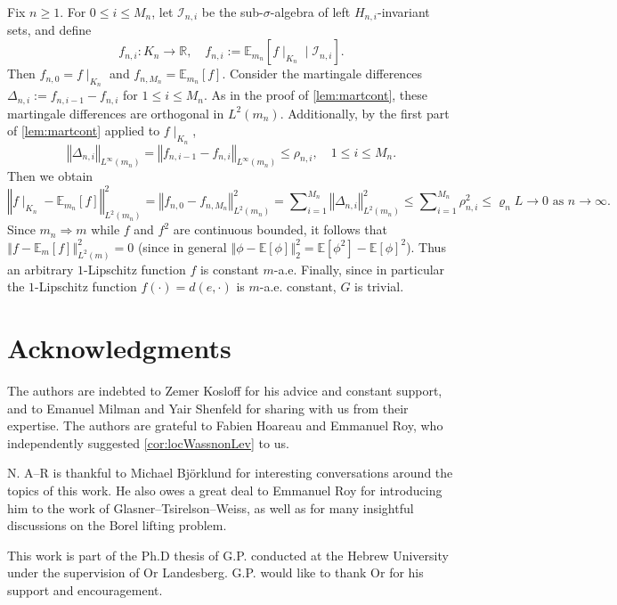 \documentclass{amsart}
\numberwithin{equation}{subsection}
\theoremstyle{plain}
\theoremstyle{definition}
\theoremstyle{plain}
\begin{document}
Fix \(n\geq1\). For \(0\leq i\leq M_{n}\), let \(\mathcal{I}_{n,i}\) be the sub-\(\sigma\)-algebra of left \(H_{n,i}\)-invariant sets, and define
\[f_{n,i}:K_{n}\to\mathbb{R},\quad f_{n,i}:=\mathbb{E}_{m_{n}}\left[f\mid_{K_{n}}\mid\mathcal{I}_{n,i}\right].\]
Then \(f_{n,0}=f\mid_{K_{n}}\) and \(f_{n,M_{n}}=\mathbb{E}_{m_{n}}\left[f\right]\). Consider the martingale differences \(\Delta_{n,i}:=f_{n,i-1}-f_{n,i}\) for \(1\leq i\leq M_{n}\). As in the proof of \cref{lem:martcont}, these martingale differences are orthogonal in \(L^{2}\left(m_{n}\right)\). Additionally, by the first part of \cref{lem:martcont} applied to \(f\mid_{K_{n}}\),
\[\left\Vert\Delta_{n,i}\right\Vert_{L^{\infty}\left(m_{n}\right)}=\left\Vert f_{n,i-1}-f_{n,i}\right\Vert_{L^{\infty}\left(m_{n}\right)}
\leq\rho_{n,i},\quad1\leq i\leq M_{n}.\]
Then we obtain
\[\left\Vert f\mid_{K_{n}}-\mathbb{E}_{m_{n}}\left[f\right]\right\Vert_{L^{2}\left(m_{n}\right)}^{2}=\left\Vert f_{n,0}-f_{n,M_{n}}\right\Vert_{L^{2}\left(m_{n}\right)}^{2}=\sum\nolimits_{i=1}^{M_{n}}\left\Vert\Delta_{n,i}\right\Vert_{L^{2}\left(m_{n}\right)}^{2}\leq\sum\nolimits_{i=1}^{M_{n}}\rho_{n,i}^{2}\leq\varrho_{n}L\to 0\text{ as }n\to\infty.\]
Since \(m_{n}\Rightarrow m\) while \(f\) and \(f^{2}\) are continuous bounded, it follows that \(\left\Vert f-\mathbb{E}_{m}\left[f\right]\right\Vert_{L^{2}\left(m\right)}^{2}=0\) (since in general \(\left\Vert \phi-\mathbb{E}\left[\phi\right]\right\Vert _{2}^{2}=\mathbb{E}\left[\phi^{2}\right]-\mathbb{E}\left[\phi\right]^{2}\)). Thus an arbitrary \(1\)-Lipschitz function \(f\) is constant \(m\)-a.e. Finally, since in particular the \(1\)-Lipschitz function \(f\left(\cdot\right)=d\left(e,\cdot\right)\) is \(m\)-a.e. constant, \(G\) is trivial. 

\section*{Acknowledgments}

The authors are indebted to Zemer Kosloff for his advice and constant support, and to Emanuel Milman and Yair Shenfeld for sharing with us from their expertise. The authors are grateful to Fabien Hoareau and Emmanuel Roy, who independently suggested \cref{cor:locWassnonLev} to us.

N. A--R is thankful to Michael Bj\"{o}rklund for interesting conversations around the topics of this work. He also owes a great deal to Emmanuel Roy for introducing him to the work of Glasner--Tsirelson--Weiss, as well as for many insightful discussions on the Borel lifting problem.

This work is part of the Ph.D thesis of G.P. conducted at the Hebrew University under the supervision of Or Landesberg. G.P. would like to thank Or for his support and encouragement.



\end{document}
